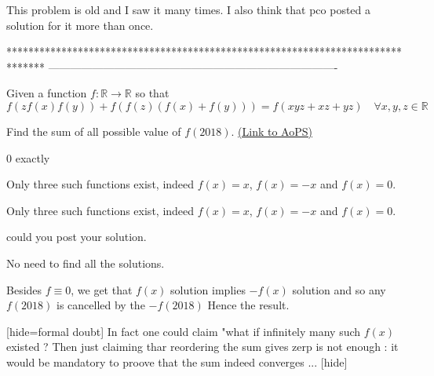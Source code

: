 \begin{solution}
	This problem is old and I saw it many times. I also think that pco posted a solution for it more than once.
\end{solution}
*******************************************************************************
-------------------------------------------------------------------------------

\begin{problem}
	Given a function $f : \mathbb{R} \to \mathbb{R}$ so that
$$f(z f(x) f(y)) + f( f(z) (f(x) + f(y) ) ) = f(xyz + xz + yz) \quad \forall x,y,z \in \mathbb{R}$$

Find the sum of all possible value of $f(2018)$.
	\flushright \href{https://artofproblemsolving.com/community/c6h1636434}{(Link to AoPS)}
\end{problem}



\begin{solution}
	0 exactly
\end{solution}



\begin{solution}
	Only three such functions exist, indeed $f(x) = x$, $f(x) = -x$ and $f(x) = 0$.
\end{solution}



\begin{solution}
	\begin{tcolorbox}Only three such functions exist, indeed $f(x) = x$, $f(x) = -x$ and $f(x) = 0$.\end{tcolorbox}

could you post your solution.
\end{solution}



\begin{solution}
	No need to find all the solutions.

Besides $f\equiv 0$, we get that $f(x)$ solution implies $-f(x)$ solution and so any $f(2018)$ is cancelled by the $-f(2018)$
Hence the result.

[hide=formal doubt]
In fact one could claim "what if infinitely many such $f(x)$ existed ?
Then just claiming thar reordering the sum gives zerp is not enough : it would be mandatory to proove that the sum indeed converges ... [\/hide]
\end{solution}



